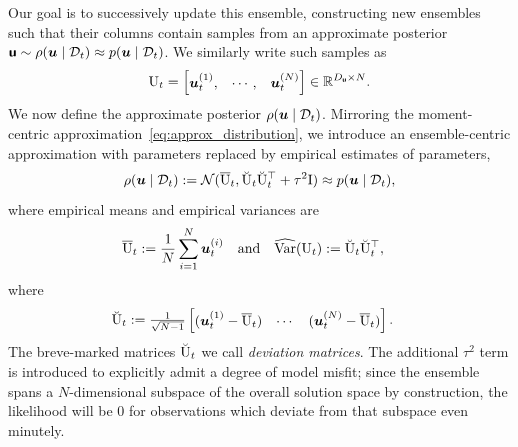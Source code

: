 Our goal is to successively update this ensemble, constructing new ensembles  such that their columns contain samples from an approximate posterior $\boldsymbol{\mathsf{u}} \sim \rho(\boldsymbol{u} \mid \mathcal{D}_t)\approx p(\boldsymbol{u} \mid \mathcal{D}_t)$. We similarly write such samples as
\begin{align*}
    \mathrm{U}_{t}=\begin{bmatrix}\boldsymbol{u}_{t}^{(1)}, & \cdots, & \boldsymbol{u}_{t}^{(N)} \end{bmatrix} \in \mathbb{R}^{D_{\boldsymbol{\mathsf{u}}}\times N}.
\end{align*}
We now define the approximate posterior $\rho(\boldsymbol{u} \mid \mathcal{D}_t)$.  Mirroring the moment-centric approximation~\eqref{eq:approx_distribution}, we introduce an ensemble-centric approximation  with parameters replaced by empirical estimates of parameters,
$$\rho(\boldsymbol{u} \mid \mathcal{D}_t) := \mathcal{N}(\overline{\mathrm{U}}_t,\breve{\mathrm{U}}_t\breve{\mathrm{U}}^{\top}_t+ \tau^2\mathrm{I}) \approx p(\boldsymbol{u} \mid \mathcal{D}_t), $$
where empirical means and empirical variances are
\begin{align*}    %
    \overline{\mm{U}}_t:=\frac{1}{N}\sum_{i=1}^N \forcingst^{(i)}_t\quad  \text{and} \quad
    \widehat{\var}(\mm{U}_t)&:=\breve{\mm{U}}_t\breve{\mm{U}}^{\top}_t,
\end{align*} where
\begin{align*}
\breve{\mathrm{U}}_t&:={\textstyle\frac{1}{\sqrt{N-1}}}\begin{bmatrix}
    (\boldsymbol{u}^{(1)}_t-\overline{\mathrm{U}}_t) & \cdots & (\boldsymbol{u}^{(N)}_t-\overline{\mathrm{U}}_t)
\end{bmatrix}.
\end{align*}
The breve-marked matrices \(\breve{\mathrm{U}}_t\) we call \emph{deviation matrices}. 
The additional \(\tau^2\) term is introduced to explicitly admit a degree of model misfit;
since the ensemble spans a \(N\)-dimensional subspace of the overall solution space by construction, the likelihood will be 0 for observations which deviate from that subspace even minutely.

